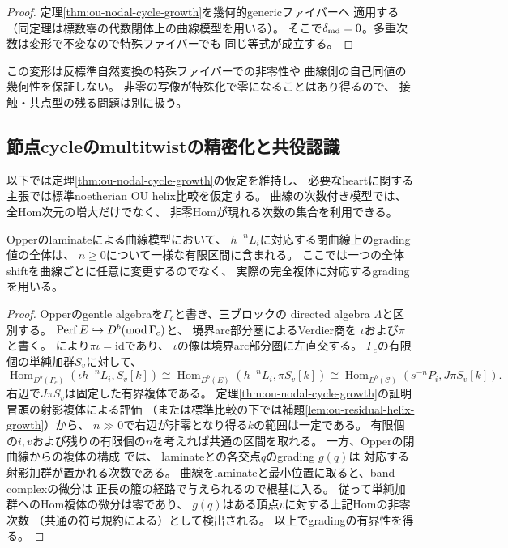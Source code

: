 \begin{proof}
定理\ref{thm:ou-nodal-cycle-growth}を幾何的genericファイバーへ
適用する（同定理は標数零の代数閉体上の曲線模型を用いる）。
そこで$\delta_{\rm md}=0$。多重次数は変形で不変なので特殊ファイバーでも
同じ等式が成立する。
\end{proof}

\begin{remark}
この変形は反標準自然変換の特殊ファイバーでの非零性や
曲線側の自己同値の幾何性を保証しない。
非零の写像が特殊化で零になることはあり得るので、
接触・共点型の残る問題は別に扱う。
\end{remark}

\subsection{節点cycleのmultitwistの精密化と共役認識}
\label{subsec:ou-nodal-graded-multitwist}
以下では定理\ref{thm:ou-nodal-cycle-growth}の仮定を維持し、
必要なheartに関する主張では標準noetherian OU helix比較を仮定する。
曲線の次数付き模型では、全Hom次元の増大だけでなく、
非零Homが現れる次数の集合を利用できる。

\begin{lemma}[helix軌道のgradingの有界性]
\label{lem:ou-nodal-grading-bound}
Opperのlaminateによる曲線模型において、
$h^{-n}L_i$に対応する閉曲線上のgrading値の全体は、
$n\geq0$について一様な有限区間に含まれる。
ここでは一つの全体shiftを曲線ごとに任意に変更するのでなく、
実際の完全複体に対応するgradingを用いる。
\end{lemma}
\begin{proof}
Opperのgentle algebraを$\Gamma_c$と書き、三ブロックの
directed algebra $\Lambda$と区別する。
$\operatorname{Perf} E\hookrightarrow D^b(\operatorname{mod}\Gamma_c)$と、
境界arc部分圏によるVerdier商を
$\iota$および$\pi$と書く。
\cite[Proposition~8.2, Lemma~8.4, Proposition~8.6,
Remark~8.7]{Opper2026}により$\pi\iota=\mathrm{id}$であり、
$\iota$の像は境界arc部分圏に左直交する。
$\Gamma_c$の有限個の単純加群$S_v$に対して、
\[
 \operatorname{Hom}_{D^b(\Gamma_c)}(\iota h^{-n}L_i,S_v[k])
 \cong\operatorname{Hom}_{D^b(E)}(h^{-n}L_i,\pi S_v[k])
 \cong\operatorname{Hom}_{D^b(\mathcal C)}(s^{-n}P_i,J\pi S_v[k]).
\]
右辺で$J\pi S_v$は固定した有界複体である。
定理\ref{thm:ou-nodal-cycle-growth}の証明冒頭の射影複体による評価
（または標準比較の下では補題\ref{lem:ou-residual-helix-growth}）から、
$n\gg0$で右辺が非零となり得る$k$の範囲は一定である。
有限個の$i,v$および残りの有限個の$n$を考えれば共通の区間を取れる。
一方、Opperの閉曲線からの複体の構成
\cite[Section~4.3, Proposition~4.6]{Opper2026}では、
laminateとの各交点$q$のgrading $g(q)$は
対応する射影加群が置かれる次数である。
曲線をlaminateと最小位置に取ると、band complexの微分は
正長の箙の経路で与えられるので根基に入る。
従って単純加群へのHom複体の微分は零であり、
$g(q)$はある頂点$v$に対する上記Homの非零次数
（共通の符号規約による）として検出される。
以上でgradingの有界性を得る。
\end{proof}

